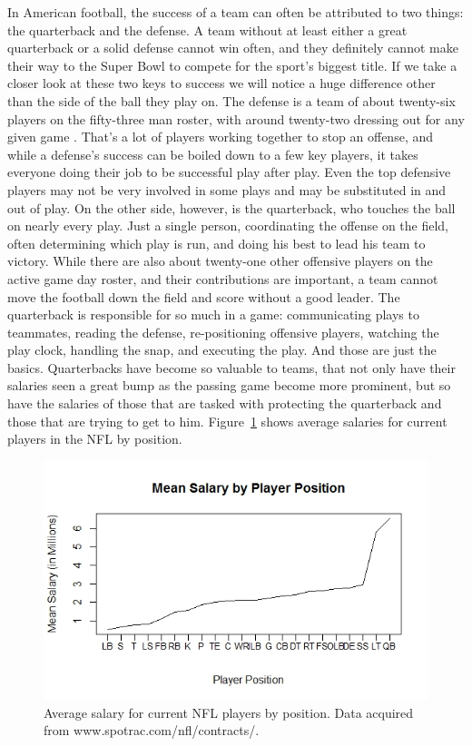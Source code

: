 \documentclass[12pt]{article}\usepackage[]{graphicx}\usepackage[]{color}
\begin{document}
In American football, the success of a team can often be attributed to two things: the quarterback and the defense. A team without at least either a great quarterback or a solid defense cannot win often, and they definitely cannot make their way to the Super Bowl to compete for the sport's biggest title. If we take a closer look at these two keys to success we will notice a huge difference other than the side of the ball they play on. The defense is a team of about twenty-six players on the fifty-three man roster, with around twenty-two dressing out for any given game \cite{anat}. That's a lot of players working together to stop an offense, and while a defense's success can be boiled down to a few key players, it takes everyone doing their job to be successful play after play. Even the top defensive players may not be very involved in some plays and may be substituted in and out of play. On the other side, however, is the quarterback, who touches the ball on nearly every play. Just a single person, coordinating the offense on the field, often determining which play is run, and doing his best to lead his team to victory. While there are also about twenty-one \cite{anat} other offensive players on the active game day roster, and their contributions are important, a team cannot move the football down the field and score without a good leader. The quarterback is responsible for so much in a game: communicating plays to teammates, reading the defense, re-positioning offensive players, watching the play clock, handling the snap, and executing the play. And those are just the basics. Quarterbacks have become so valuable to teams, that not only have their salaries seen a great bump as the passing game become more prominent, but so have the salaries of those that are tasked with protecting the quarterback and those that are trying to get to him. Figure~\ref{fig:sal} shows average salaries for current players in the NFL by position.

\begin{figure}[h]
\centering
\includegraphics[width=1.2\textwidth]{salary.jpeg}
\captionsetup{font=footnotesize,labelfont=footnotesize}
\caption{\label{fig:sal} Average salary for current NFL players by position. Data acquired from www.spotrac.com/nfl/contracts/.}
\end{figure}
\end{document}
